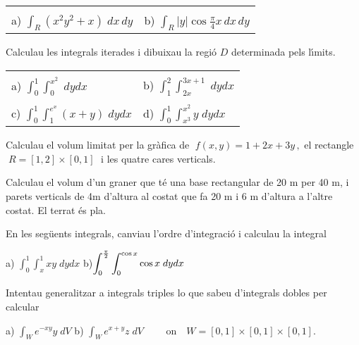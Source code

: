 \begin{tabular}{ll}
 & \\
a) $\displaystyle\int_R(x^2y^2+x)\; dx\,dy$ \hspace{2cm} &
b) $\displaystyle\int_R|y|\cos {\frac{\pi}{4}x}\, dx\,dy$\\
\end{tabular}


\vspace{0.7 cm}
\probl Calculau les integrals iterades i dibuixau la
regi{\'o} $D$ determinada pels l{\'\i}mits.

\begin{tabular}{ll}
 & \\
a) $\displaystyle\int_0^1\int_0^{x^2}\; dydx$ \hspace{2cm} &
b) $\displaystyle\int_1^2\int_{2x}^{3x+1}\;dy dx$ \\
 & \\
c) $\displaystyle\int_0^1\int_1^{e^x}(x+y)\;dy dx$ &
d) $\displaystyle\int_0^1\int_{x^3}^{x^2} y\;dy dx$ \\
\end{tabular}


\vspace{0.7 cm}
\probl Calculau el volum limitat per la gr{\`a}fica de
$\;f(x,y)=1+2x+3y\,,$ el rectangle $\;R=[1,2]\times[0,1]\;$ i les
quatre cares verticals.


\vspace{0.7 cm}
\probl Calculau el volum d'un graner que t{\'e} una base
rectangular de 20 m per 40 m, i parets verticals de 4m d'altura al
costat que fa 20 m i 6 m d'altura a l'altre costat. El terrat {\'e}s
pla.


\vspace{0.7 cm}
\probl En les seg{\"u}ents integrals, canviau l'ordre
d'integraci{\'o} i calculau la integral

\vspace{0.7 cm} a) $\displaystyle\int_0^1\int_x^1 xy\;dydx$
\hspace{2.4cm} b)$\displaystyle\int_0^{\pi\over 2}\int_0^{\cos x}
\cos x \; dydx$ 


\vspace{0.7 cm} 
\probl Intentau generalitzar a integrals triples lo
que sabeu d'integrals dobles per calcular

\vspace{0.7 cm} a) $\displaystyle\int_W e^{-xy}y\;dV$  \hspace{2cm}
b) $\displaystyle\int_W e^{x+y}z\;dV\qquad$ on $\ \ \ W=[0,1]\times
[0,1]\times [0,1]$.

